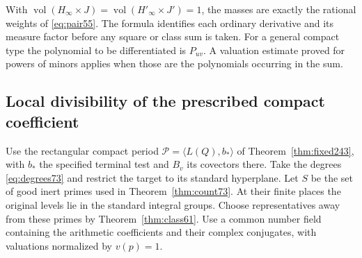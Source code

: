 \documentclass[a4paper,11pt]{article}
\theoremstyle{definition}
\theoremstyle{remark}
\numberwithin{equation}{section}
\begin{document}
With \(\operatorname{vol}(H_\infty\times J)
=\operatorname{vol}(H'_\infty\times J')=1\), the masses are exactly
the rational weights of \eqref{eq:pair55}. The formula identifies
each ordinary derivative and its measure factor before any square or
class sum is taken. For a general compact type the polynomial to be
differentiated is \(P_{uv}\). A valuation estimate proved for powers
of minors applies when those are the polynomials occurring in the sum.

\subsection{Local divisibility of the prescribed compact coefficient}\label{nav:VIII-34}
Use the rectangular compact period \(\mathcal P=\langle L(Q),b_*\rangle\)
of Theorem~\ref{thm:fixed243}, with \(b_*\) the specified terminal
test and \(B_v\) its covectors there. Take the degrees
\eqref{eq:degrees73} and restrict the target to its standard
hyperplane. Let \(S\) be the set of good inert primes used in
Theorem~\ref{thm:count73}. At their finite places the original
levels lie in the standard integral groups. Choose representatives
away from these primes by Theorem~\ref{thm:class61}. Use a common
number field containing the arithmetic coefficients and their
complex conjugates, with valuations normalized by \(v(p)=1\).
\end{document}

